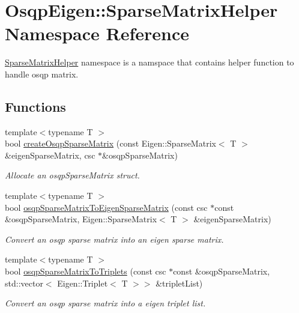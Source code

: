 \section{Osqp\+Eigen\+:\+:Sparse\+Matrix\+Helper Namespace Reference}
\label{namespaceOsqpEigen_1_1SparseMatrixHelper}


\hyperlink{namespaceOsqpEigen_1_1SparseMatrixHelper}{Sparse\+Matrix\+Helper} namespace is a namspace that contains helper function to handle osqp matrix.  


\subsection*{Functions}
\begin{DoxyCompactItemize}
\item 
{\footnotesize template$<$typename T $>$ }\\bool \hyperlink{namespaceOsqpEigen_1_1SparseMatrixHelper_afd0b552419320e79e627e5d6c9e5715c}{create\+Osqp\+Sparse\+Matrix} (const Eigen\+::\+Sparse\+Matrix$<$ T $>$ \&eigen\+Sparse\+Matrix, csc $\ast$\&osqp\+Sparse\+Matrix)
\begin{DoxyCompactList}\small\item\em Allocate an osqp\+Sparse\+Matrix struct. \end{DoxyCompactList}\item 
{\footnotesize template$<$typename T $>$ }\\bool \hyperlink{namespaceOsqpEigen_1_1SparseMatrixHelper_aec1a2210ce843eda8e4000c81d886131}{osqp\+Sparse\+Matrix\+To\+Eigen\+Sparse\+Matrix} (const csc $\ast$const \&osqp\+Sparse\+Matrix, Eigen\+::\+Sparse\+Matrix$<$ T $>$ \&eigen\+Sparse\+Matrix)
\begin{DoxyCompactList}\small\item\em Convert an osqp sparse matrix into an eigen sparse matrix. \end{DoxyCompactList}\item 
{\footnotesize template$<$typename T $>$ }\\bool \hyperlink{namespaceOsqpEigen_1_1SparseMatrixHelper_af45a1d77519f691542150e506b6dcdeb}{osqp\+Sparse\+Matrix\+To\+Triplets} (const csc $\ast$const \&osqp\+Sparse\+Matrix, std\+::vector$<$ Eigen\+::\+Triplet$<$ T $>$$>$ \&triplet\+List)
\begin{DoxyCompactList}\small\item\em Convert an osqp sparse matrix into a eigen triplet list. \end{DoxyCompactList}\item 
$$
\end{DoxyCompactItemize}

